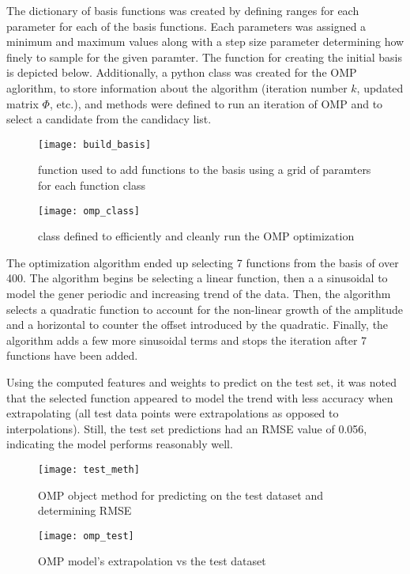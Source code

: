 \documentclass{article}
\begin{document}
The dictionary of basis functions was created by defining ranges for each parameter for each of the basis functions. Each parameters was assigned a minimum and maximum values along with a step size parameter determining how finely to sample for the given paramter. The function for creating the initial basis is depicted below. Additionally, a python class was created for the OMP aglorithm, to store  information about the algorithm (iteration number $k$, updated matrix $\Phi$, etc.), and methods were defined to run an iteration of OMP and to select a candidate from the candidacy list.

\begin{figure}[H]
\centering
\texttt{[image: build\_basis]}
\caption{function used to add functions to the basis using a grid of paramters for each function class}
\end{figure}

\begin{figure}[H]
\centering
\texttt{[image: omp\_class]}
\caption{class defined to efficiently and cleanly run the OMP optimization}
\end{figure}

The optimization algorithm ended up selecting 7 functions from the basis of over 400. The algorithm begins be selecting a linear function, then a a sinusoidal to model the gener periodic and increasing trend of the data. Then, the algorithm selects a quadratic function to account for the non-linear growth of the amplitude and a horizontal to counter the offset introduced by the quadratic. Finally, the algorithm adds a few more sinusoidal terms and stops the iteration after 7 functions have been added.

Using the computed features and weights to predict on the test set, it was noted that the selected function appeared to model the trend with less accuracy when extrapolating (all test data points were extrapolations as opposed to interpolations). Still, the test set predictions had an RMSE value of 0.056, indicating the model performs reasonably well.

\begin{figure}[H]
\centering
\texttt{[image: test\_meth]}
\caption{OMP object method for predicting on the test dataset and determining RMSE}
\end{figure}

\begin{figure}[H]
\centering
\texttt{[image: omp\_test]}
\caption{OMP model's extrapolation vs the test dataset}
\end{figure}
\end{document}

